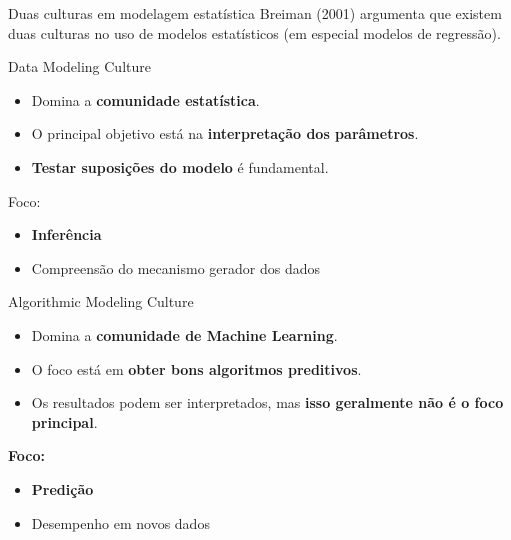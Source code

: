 \documentclass[
  ignorenonframetext,
  aspectratio=169,
]{beamer}
\providecommand{\tightlist}{%
  \setlength{\itemsep}{0pt}\setlength{\parskip}{0pt}}
\begin{document}
\begin{frame}{Duas culturas em modelagem estatística}
\label{duas-culturas-em-modelagem-estatuxedstica}
Breiman (2001) argumenta que existem duas culturas no uso de modelos
estatísticos (em especial modelos de regressão).

\begin{block}{Data Modeling Culture}
\label{data-modeling-culture}
\begin{itemize}
\tightlist
\item
  Domina a \textbf{comunidade estatística}.
\item
  O principal objetivo está na \textbf{interpretação dos parâmetros}.
\item
  \textbf{Testar suposições do modelo} é fundamental.
\end{itemize}
\end{block}

\begin{block}{Foco:}
\label{foco}
\begin{itemize}
\tightlist
\item
  \textbf{Inferência}
\item
  Compreensão do mecanismo gerador dos dados
\end{itemize}
\end{block}
\end{frame}

\begin{frame}
\begin{block}{Algorithmic Modeling Culture}
\label{algorithmic-modeling-culture}
\begin{itemize}
\tightlist
\item
  Domina a \textbf{comunidade de Machine Learning}.
\item
  O foco está em \textbf{obter bons algoritmos preditivos}.
\item
  Os resultados podem ser interpretados, mas \textbf{isso geralmente não
  é o foco principal}.
\end{itemize}
\end{block}

\begin{block}{\textbf{Foco:}}
\label{foco-1}
\begin{itemize}
\tightlist
\item
  \textbf{Predição}
\item
  Desempenho em novos dados
\end{itemize}
\end{block}
\end{frame}
\end{document}

